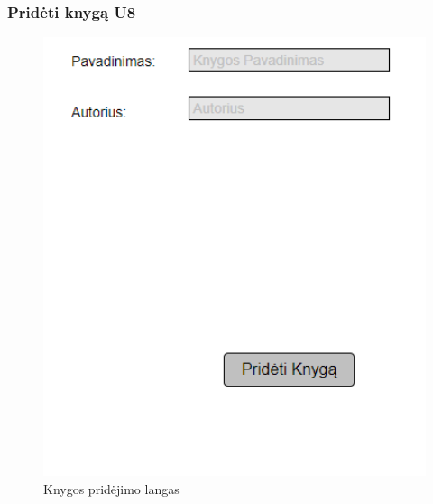 \documentclass{VUMIFPSkursinis}
\begin{document}
\subsubsection{Pridėti knygą U8}

\begin{figure}[H]
\label{fig:pridetknygalang}
    \centering
    \includegraphics[width=1\textwidth]{vidines/ucpridetiknyga}
	\caption{Knygos pridėjimo langas}
\end{figure}
\end{document}
